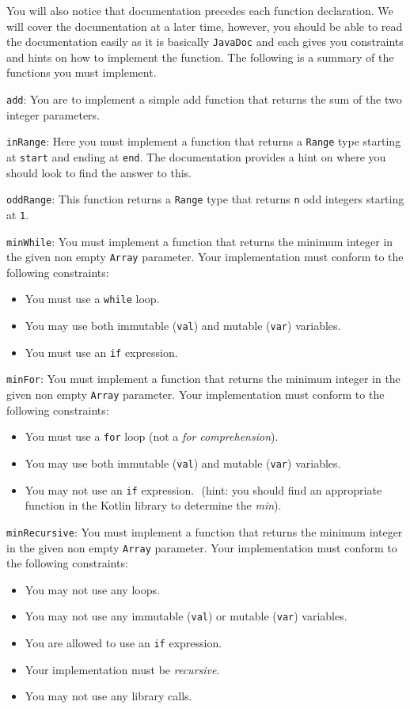 \documentclass[12pt,a4paper]{exam}
\begin{document}
You will also notice that documentation precedes each function declaration. 
We will cover the documentation at a later time, however, you should be able to read the documentation 
easily as it is basically \verb!JavaDoc! and each gives you constraints and hints on how to implement the function. 
The following is a summary of the functions you must implement.
\begin{questions}
\question
\verb!add!: You are to implement a simple add function that returns 
the sum of the two integer parameters.

\question
\verb!inRange!: Here you must implement a function that returns a \verb!Range! 
type starting at \verb!start! and ending at \verb!end!. 
The documentation provides a hint on where you should look to find the answer to this.

\question
\verb!oddRange!: This function returns a \verb!Range! type that returns \verb!n! 
odd integers starting at \verb!1!.

\question
\verb!minWhile!: 
You must implement a function that returns the minimum integer in the given non empty \verb!Array! parameter. 
Your implementation must conform to the following constraints:
\begin{itemize}
	\item You must use a \verb!while! loop.
	\item You may use both immutable (\verb!val!) and mutable (\verb!var!) variables. 
	\item You must use an \verb!if! expression.
\end{itemize}

\question
\verb!minFor!: 
You must implement a function that returns the minimum integer in the given non empty \verb!Array! 
parameter. Your implementation must conform to the following constraints:
\begin{itemize}
	\item You must use a \verb!for! loop (not a \emph{for comprehension}).
	\item You may use both immutable (\verb!val!) and mutable (\verb!var!) variables.
	\item You may not use an \verb!if! expression.  (hint: you should find an appropriate function in the Kotlin library to determine the \emph{min}).
\end{itemize}

\question
\verb!minRecursive!: 
You must implement a function that returns the minimum integer in the given non empty \verb!Array! parameter. 
Your implementation must conform to the following constraints:
\begin{itemize}
	\item You may not use any loops.
	\item You may not use any immutable (\verb!val!) or mutable (\verb!var!) variables. 
	\item You are allowed to use an \verb!if! expression.
	\item Your implementation must be \emph{recursive}.	
	\item You may not use any library calls.
\end{itemize}


\end{questions}
\end{document}
